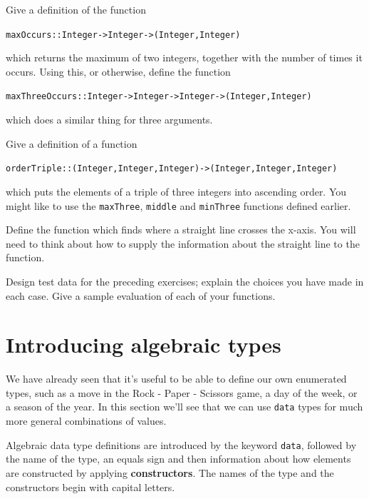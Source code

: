 \begin{exercises}
\item
Give a definition of the function
\begin{alltt}
maxOccurs :: Integer -> Integer -> (Integer,Integer)
\end{alltt}
which returns the maximum of two integers, together with the number of times
it occurs. Using this, or otherwise, define the function
\begin{alltt}
maxThreeOccurs :: Integer -> Integer -> Integer -> (Integer,Integer)
\end{alltt}
which does a similar thing for three arguments.

\item
Give a definition of a function
\begin{alltt}
orderTriple :: (Integer,Integer,Integer) -> (Integer,Integer,Integer)
\end{alltt} 
which puts the elements of a triple of three integers into ascending order.
You might like to use the \texttt{maxThree}, \texttt{middle} and
\texttt{minThree} functions defined earlier.

\item
Define the function which finds where a straight line crosses the x-axis. 
You will need to think about how to supply the information about the
straight line to the function.

\item Design test data for the preceding exercises; explain the choices you
have made in each case. Give a sample evaluation of each of your functions.

\end{exercises}



\section{Introducing algebraic types}
\label{introAlg}

We have already seen that it's useful to be able to define our own enumerated types, such as a move in the Rock - Paper - Scissors game, a day of the week, or a season of the year. In this section we'll see that we can use \texttt{data} types for much more general combinations of values. 


Algebraic data type definitions are introduced by the keyword \texttt{data}, followed by 
the name of the type, an equals sign and then information about how elements are constructed by applying 
\textbf{constructors}.  The names of the type and the constructors begin with
capital letters.

